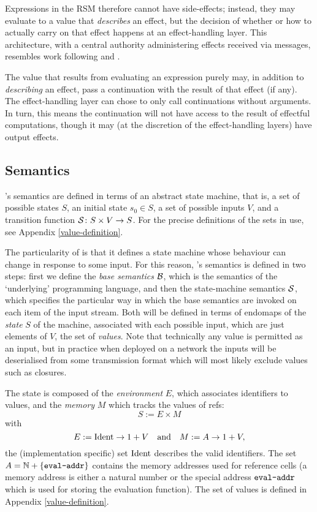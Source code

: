Expressions in the RSM therefore cannot have
side-effects; instead, they may evaluate to a value that \emph{describes} an effect,
but the decision of whether or how to actually carry on that effect happens at an
effect-handling layer. This architecture, with a central authority
administering effects received via messages, resembles work following
\cite{Cartwright1994} and \cite{Bauer2013}.

The value that results from evaluating an expression purely may, in addition to
\emph{describing} an effect, pass a continuation with the result of that
effect (if any). The effect-handling layer can chose to only call continuations
without arguments. In turn, this means the continuation will not have access to
the result of effectful computations, though it may (at the discretion of the
effect-handling layers) have output effects.

\subsection{Semantics}

\rad{}'s semantics are defined in terms of an abstract state machine, that is, a
set of possible states $S$, an initial state $s_0 \in S$, a set of possible
inputs $V$, and a transition function $\S \colon S \times V \to S$.
For the precise definitions of the sets in use, see Appendix
\ref{value-definition}.

The particularity of \rad{} is that it defines a state machine whose behaviour
can change in response to some input. For this reason, \rad{}'s semantics is
defined in two steps: first we define the \emph{base semantics} $\B$, which is
the semantics of the `underlying' programming language, and then the
state-machine semantics $\S$, which specifies the particular way in which the
base semantics are invoked on each item of the input stream. Both will be
defined in terms of endomaps of the \emph{state} $S$ of the machine, associated
with each possible input, which are just elements of $V$, the set of
\emph{values}. Note that technically any value is permitted as an input, but in
practice when deployed on a network the inputs will be deserialised from some
transmission format which will most likely exclude values such as closures.

The state is composed of the \emph{environment} $E$, which associates identifiers to
values, and the \emph{memory} $M$ which tracks the values of refs:
\[
S := E \times M
\]
with
\[
E := \Ident \to 1 + V \quad \text{and} \quad M := A \to 1 + V,
\]
the (implementation specific) set $\Ident$ describes the valid identifiers. The
set $A = \mathbb{N} + \{\evalAddr\}$ contains the memory addresses used for
reference cells (a memory address is either a natural number or the
special address $\evalAddr$ which is used for storing the evaluation function).
The set of values is defined in Appendix \ref{value-definition}.

